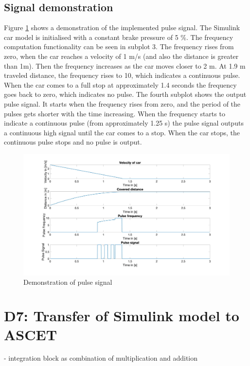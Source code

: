\section{Signal demonstration}\label{sec:D6_SignalDemonstration}
Figure \ref{fig:D6_Result} shows a demonstration of the implemented pulse signal. The Simulink car model is initialised with a constant brake pressure of 5 \%. The frequency computation functionality can be seen in subplot 3. The frequency rises from zero, when the car reaches a velocity of 1 m/s (and also the distance is greater than 1m). Then the frequency increases as the car moves closer to 2 m. At 1.9 m traveled distance, the frequency rises to 10, which indicates a continuous pulse. When the car comes to a full stop at approximately 1.4 seconds the frequency goes back to zero, which indicates no pulse. The fourth subplot shows the output pulse signal. It starts when the frequency rises from zero, and the period of the pulses gets shorter with the time increasing. When the frequency starts to indicate a continuous pulse (from approximately 1.25 s) the pulse signal outputs a continuous high signal until the car comes to a stop. When the car stops, the continuous pulse stops and no pulse is output.

\begin{figure}[H]
\centering
\includegraphics[width=1\textwidth]{images/D6_result.jpg}
\caption{Demonstration of pulse signal}
\label{fig:D6_Result}
\end{figure}

\chapter{D7: Transfer of Simulink model to ASCET}\label{cha:D7}
- integration block as combination of multiplication and addition

